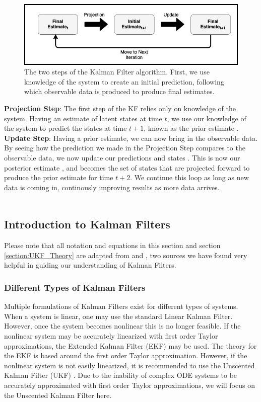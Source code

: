 \begin{figure}[H]
    \centering
    \includegraphics[width=15cm]{Kalman_Filter_Images/Simple_UKF_Flow.jpg}
    \caption{The two steps of the Kalman Filter algorithm. First, we use knowledge of the system to create an initial prediction, following which observable data is produced to produce final estimates.}
    \label{fig:UKF_TwoSteps}
\end{figure}

\textbf{Projection Step}: The first step of the KF relies only on knowledge of the system. Having an estimate of latent states at time $t$, we use our knowledge of the system to predict the states at time $t + 1$, known as the prior estimate \cite{SimonHaykinText} \cite{GoveHollingerDual}.\\

\textbf{Update Step}: Having a prior estimate, we can now bring in the observable data. By seeing how the prediction we made in the Projection Step compares to the observable data, we now update our predictions and states \cite{GoveHollingerDual}. This is now our posterior estimate \cite{SimonHaykinText}, and becomes the set of states that are projected forward to produce the prior estimate for time $t+2$. We continue this loop as long as new data is coming in, continously improving results as more data arrives. \\
\\


\subsection{Introduction to Kalman Filters}
    Please note that all notation and equations in this section and section \ref{section:UKF_Theory} are adapted from \cite{VanMereChapter} and \cite{SimonHaykinText}, two sources we have found very helpful in guiding our understanding of Kalman Filters.
    \subsubsection{Different Types of Kalman Filters}
    Multiple formulations of Kalman Filters exist for different types of systems. When a system is linear, one may use the standard Linear Kalman Filter. However, once the system becomes nonlinear this is no longer feasible. If the nonlinear system may be accurately linearized with first order Taylor approximations, the Extended Kalman Filter (EKF) may be used. The theory for the EKF is based around the first order Taylor approximation. However, if the nonlinear system  is not easily linearized, it is recommended to use the Unscented Kalman Filter (UKF) \cite{VanMereChapter}. Due to the inability of complex ODE systems to be accurately approximated with first order Taylor approximations, we will focus on the Unscented Kalman Filter here.
    
